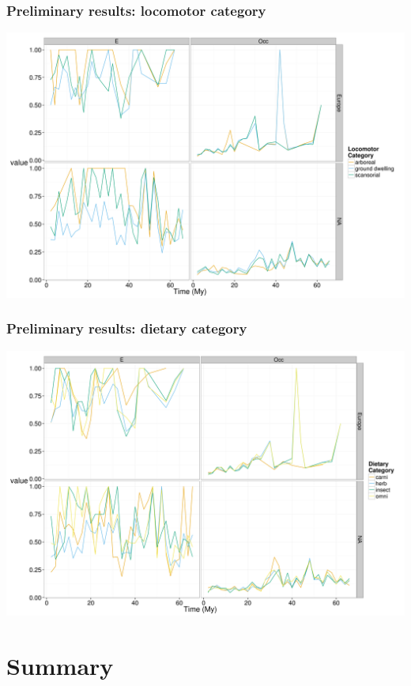 \documentclass{beamer}
\begin{document}
\begin{frame}
  \frametitle{Preliminary results: locomotor category}

  \begin{center}
    \includegraphics[height = 0.8\textheight, width = \textwidth, keepaspectratio = true]{figure/comp_loco}
  \end{center}
\end{frame}

\begin{frame}
  \frametitle{Preliminary results: dietary category}

  \begin{center}
    \includegraphics[height = 0.8\textheight, width = \textwidth, keepaspectratio = true]{figure/comp_diet}
  \end{center}
\end{frame}


\section{Summary}
\end{document}
